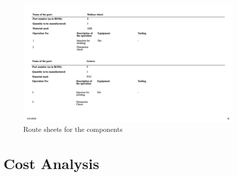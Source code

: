 \documentclass[12pt]{report}
\begin{document}
\begin{appendices}
\begin{figure}[H]
    \centering
    \includegraphics[width=\textwidth]{Slide12.jpeg} 
    \caption{Route sheets for the components}
    \label{fig:route-sheet}
\end{figure}

\section{Cost Analysis}


\end{appendices}
\end{document}
